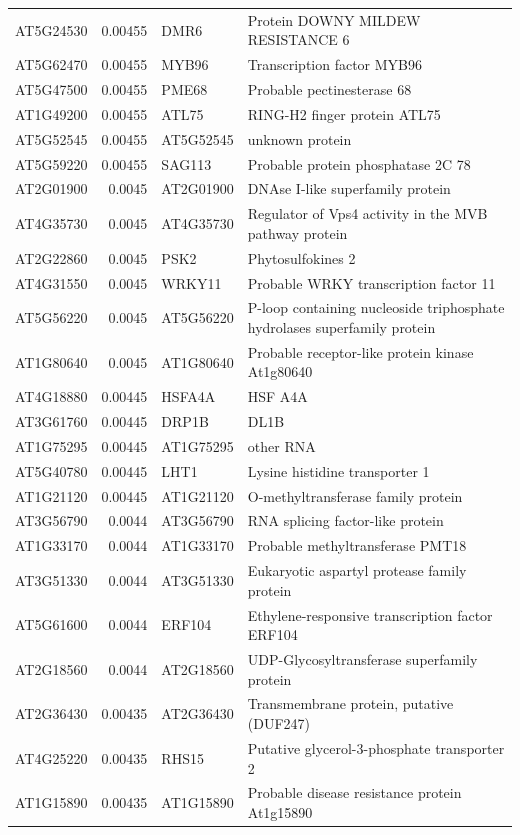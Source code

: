 \documentclass[11pt]{article}
\begin{document}
\begin{center}
\begin{tabular}{lrll}
AT5G24530 & 0.00455 & DMR6 & Protein DOWNY MILDEW RESISTANCE 6\\
AT5G62470 & 0.00455 & MYB96 & Transcription factor MYB96\\
AT5G47500 & 0.00455 & PME68 & Probable pectinesterase 68\\
AT1G49200 & 0.00455 & ATL75 & RING-H2 finger protein ATL75\\
AT5G52545 & 0.00455 & AT5G52545 & unknown protein\\
AT5G59220 & 0.00455 & SAG113 & Probable protein phosphatase 2C 78\\
AT2G01900 & 0.0045 & AT2G01900 & DNAse I-like superfamily protein\\
AT4G35730 & 0.0045 & AT4G35730 & Regulator of Vps4 activity in the MVB pathway protein\\
AT2G22860 & 0.0045 & PSK2 & Phytosulfokines 2\\
AT4G31550 & 0.0045 & WRKY11 & Probable WRKY transcription factor 11\\
AT5G56220 & 0.0045 & AT5G56220 & P-loop containing nucleoside triphosphate hydrolases superfamily protein\\
AT1G80640 & 0.0045 & AT1G80640 & Probable receptor-like protein kinase At1g80640\\
AT4G18880 & 0.00445 & HSFA4A & HSF A4A\\
AT3G61760 & 0.00445 & DRP1B & DL1B\\
AT1G75295 & 0.00445 & AT1G75295 & other RNA\\
AT5G40780 & 0.00445 & LHT1 & Lysine histidine transporter 1\\
AT1G21120 & 0.00445 & AT1G21120 & O-methyltransferase family protein\\
AT3G56790 & 0.0044 & AT3G56790 & RNA splicing factor-like protein\\
AT1G33170 & 0.0044 & AT1G33170 & Probable methyltransferase PMT18\\
AT3G51330 & 0.0044 & AT3G51330 & Eukaryotic aspartyl protease family protein\\
AT5G61600 & 0.0044 & ERF104 & Ethylene-responsive transcription factor ERF104\\
AT2G18560 & 0.0044 & AT2G18560 & UDP-Glycosyltransferase superfamily protein\\
AT2G36430 & 0.00435 & AT2G36430 & Transmembrane protein, putative (DUF247)\\
AT4G25220 & 0.00435 & RHS15 & Putative glycerol-3-phosphate transporter 2\\
AT1G15890 & 0.00435 & AT1G15890 & Probable disease resistance protein At1g15890\\

\end{tabular}
\end{center}
\end{document}
